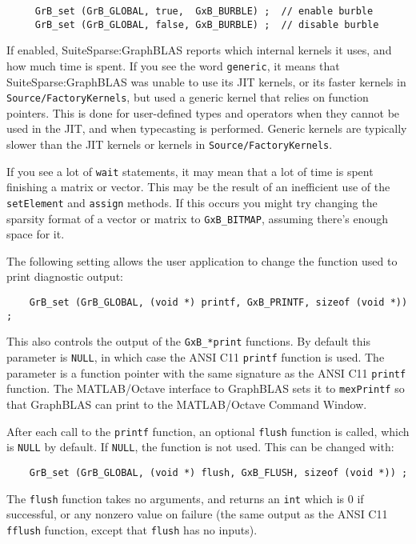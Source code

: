 {\footnotesize
\begin{verbatim}
     GrB_set (GrB_GLOBAL, true,  GxB_BURBLE) ;  // enable burble
     GrB_set (GrB_GLOBAL, false, GxB_BURBLE) ;  // disable burble \end{verbatim}}

If enabled, SuiteSparse:GraphBLAS reports which internal kernels it uses, and
how much time is spent.  If you see the word \verb'generic', it means that
SuiteSparse:GraphBLAS was unable to use its JIT kernels, or its faster kernels
in \verb'Source/FactoryKernels', but used a generic kernel that relies on
function pointers.  This is done for user-defined types and operators when they
cannot be used in the JIT, and when typecasting is performed.  Generic kernels
are typically slower than the JIT kernels or kernels in
\verb'Source/FactoryKernels'.

If you see a lot of \verb'wait' statements, it may mean that a lot of time is
spent finishing a matrix or vector.  This may be the result of an inefficient
use of the \verb'setElement' and \verb'assign' methods.  If this occurs you
might try changing the sparsity format of a vector or matrix to
\verb'GxB_BITMAP', assuming there's enough space for it.

The following setting allows the user application to change the
function used to print diagnostic output:

{\small
\begin{verbatim}
    GrB_set (GrB_GLOBAL, (void *) printf, GxB_PRINTF, sizeof (void *)) ; \end{verbatim} }

This also controls the output of the
\verb'GxB_*print' functions.  By default this parameter is \verb'NULL', in
which case the ANSI C11 \verb'printf' function is used.  The parameter is a
function pointer with the same signature as the ANSI C11 \verb'printf'
function.  The MATLAB/Octave interface to GraphBLAS sets it to \verb'mexPrintf'
so that GraphBLAS can print to the MATLAB/Octave Command Window.

After each call to the \verb'printf' function, an optional
\verb'flush' function is called, which is \verb'NULL' by default.  If
\verb'NULL', the function is not used.  This can be changed with:

{\small
\begin{verbatim}
    GrB_set (GrB_GLOBAL, (void *) flush, GxB_FLUSH, sizeof (void *)) ; \end{verbatim} }

The \verb'flush' function takes no
arguments, and returns an \verb'int' which is 0 if successful, or any nonzero
value on failure (the same output as the ANSI C11 \verb'fflush' function,
except that \verb'flush' has no inputs).

